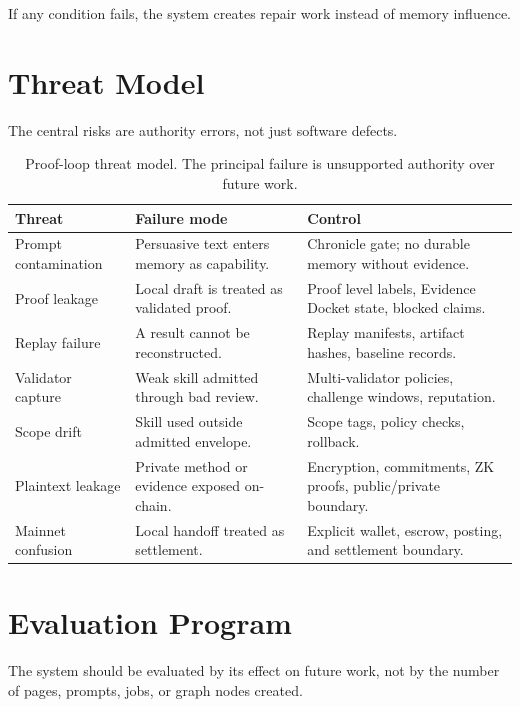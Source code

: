 \documentclass[11pt]{article}
\begin{document}
If any condition fails, the system creates repair work instead of memory influence.

\section{Threat Model}
The central risks are authority errors, not just software defects.

\begin{table}[h]
\centering
\small
\begin{tabularx}{\textwidth}{@{}p{1.35in}X X@{}}
\toprule
Threat & Failure mode & Control \\
\midrule
Prompt contamination & Persuasive text enters memory as capability. & Chronicle gate; no durable memory without evidence. \\
Proof leakage & Local draft is treated as validated proof. & Proof level labels, Evidence Docket state, blocked claims. \\
Replay failure & A result cannot be reconstructed. & Replay manifests, artifact hashes, baseline records. \\
Validator capture & Weak skill admitted through bad review. & Multi-validator policies, challenge windows, reputation. \\
Scope drift & Skill used outside admitted envelope. & Scope tags, policy checks, rollback. \\
Plaintext leakage & Private method or evidence exposed on-chain. & Encryption, commitments, ZK proofs, public/private boundary. \\
Mainnet confusion & Local handoff treated as settlement. & Explicit wallet, escrow, posting, and settlement boundary. \\
\bottomrule
\end{tabularx}
\caption{Proof-loop threat model. The principal failure is unsupported authority over future work.}
\end{table}

\section{Evaluation Program}
The system should be evaluated by its effect on future work, not by the number of pages, prompts, jobs, or graph nodes created.
\end{document}

